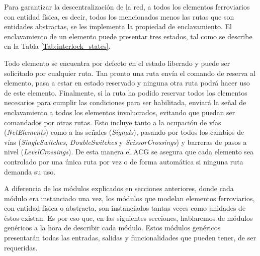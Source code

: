 Para garantizar la descentralización de la red, a todos los elementos ferroviarios con entidad física, es decir, todos los mencionados menos las rutas que son entidades abstractas, se les implementa la propiedad de enclavamiento. El enclavamiento de un elemento puede presentar tres estados, tal como se describe en la Tabla \ref{Tab:interlock_states}.

	\begin{table}[!h]
	{
		\caption{Estados de enclavamiento de cada elemento ferroviario.}
		\label{Tab:interlock_states}
		\centering
	}
	\end{table}

Todo elemento se encuentra por defecto en el estado liberado y puede ser solicitado por cualquier ruta. Tan pronto una ruta envía el comando de reserva al elemento, pasa a estar en estado reservado y ninguna otra ruta podrá hacer uso de este elemento. Finalmente, si la ruta ha podido reservar todos los elementos necesarios para cumplir las condiciones para ser habilitada, enviará la señal de enclavamiento a todos los elementos involucrados, evitando que puedan ser comandados por otras rutas. Esto incluye tanto a la ocupación de vías (\textit{NetElements}) como a las señales (\textit{Signals}), pasando por todos los cambios de vías (\textit{SingleSwitches}, \textit{DoubleSwitches} y \textit{ScissorCrossings}) y barreras de pasos a nivel (\textit{LevelCrossings}). De esta manera el ACG se asegura que cada elemento sea controlado por una única ruta por vez o de forma automática si ninguna ruta demanda su uso.

A diferencia de los módulos explicados en secciones anteriores, donde cada módulo era instanciado una vez, los módulos que modelan elementos ferroviarios, con entidad física o abstracta, son instanciados tantas veces como unidades de éstos existan. Es por eso que, en las siguientes secciones, hablaremos de módulos genéricos a la hora de describir cada módulo. Estos módulos genéricos presentarán todas las entradas, salidas y funcionalidades que pueden tener, de ser requeridas. 

